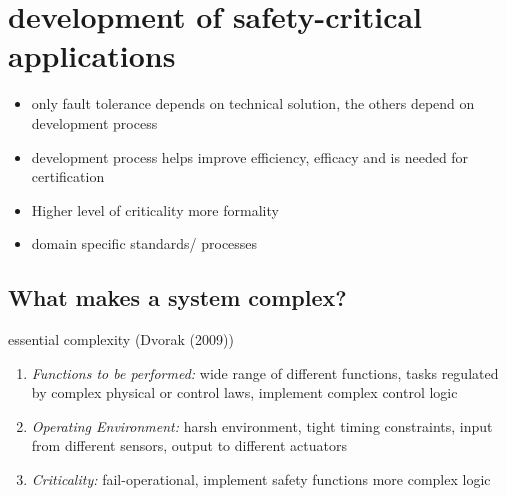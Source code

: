 \documentclass[a4paper, 10pt]{article}
\begin{document}





\section*{development of safety-critical applications}
\begin{itemize}
    \item only fault tolerance depends on technical solution, the others depend on development process
    \item development process helps improve efficiency, efficacy and is needed for certification
    \item Higher level of criticality \follows more formality
    \item domain specific standards/ processes
\end{itemize}

\subsection*{What makes a system complex?}
essential complexity (Dvorak (2009))
\begin{enumerate}
    \item \emph{Functions to be performed:} wide range of different functions, tasks regulated by complex physical or control laws, implement complex control logic
    \item \emph{Operating Environment:} harsh environment, tight timing constraints, input from different sensors, output to different actuators
    \item \emph{Criticality:} fail-operational, implement safety functions \follows more complex logic
\end{enumerate}
\end{document}
